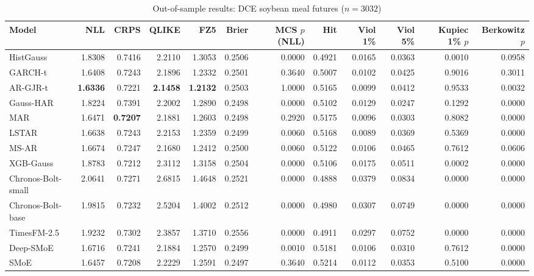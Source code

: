 \begin{table}[!htbp]\centering\scriptsize
\caption{Out-of-sample results: DCE soybean meal futures ($n=3032$)}\label{tab:asset_m_main}
\begin{adjustbox}{max width=\textwidth}
\begin{tabular}{lrrrrrrrrrrr}
\toprule
Model & NLL & CRPS & QLIKE & FZ5 & Brier & MCS $p$ (NLL) & Hit & Viol 1\% & Viol 5\% & Kupiec 1\% $p$ & Berkowitz $p$\\
\midrule
HistGauss & 1.8308 & 0.7416 & 2.2110 & 1.3053 & 0.2506 & 0.0000 & 0.4921 & 0.0165 & 0.0363 & 0.0010 & 0.0958\\
GARCH-t & 1.6408 & 0.7243 & 2.1896 & 1.2332 & 0.2501 & 0.3640 & 0.5007 & 0.0102 & 0.0425 & 0.9016 & 0.3011\\
AR-GJR-t & \textbf{1.6336} & 0.7221 & \textbf{2.1458} & \textbf{1.2132} & 0.2503 & 1.0000 & 0.5165 & 0.0099 & 0.0412 & 0.9533 & 0.0032\\
Gauss-HAR & 1.8224 & 0.7391 & 2.2002 & 1.2890 & 0.2498 & 0.0000 & 0.5102 & 0.0129 & 0.0247 & 0.1292 & 0.0000\\
MAR & 1.6471 & \textbf{0.7207} & 2.1881 & 1.2603 & 0.2498 & 0.2920 & 0.5175 & 0.0096 & 0.0303 & 0.8082 & 0.0000\\
LSTAR & 1.6638 & 0.7243 & 2.2153 & 1.2359 & 0.2499 & 0.0060 & 0.5168 & 0.0089 & 0.0369 & 0.5369 & 0.0000\\
MS-AR & 1.6674 & 0.7247 & 2.1680 & 1.2412 & 0.2500 & 0.0060 & 0.5122 & 0.0106 & 0.0465 & 0.7612 & 0.0606\\
XGB-Gauss & 1.8783 & 0.7212 & 2.3112 & 1.3158 & 0.2504 & 0.0000 & 0.5106 & 0.0175 & 0.0511 & 0.0002 & 0.0000\\
Chronos-Bolt-small & 2.0641 & 0.7271 & 2.6815 & 1.4648 & 0.2521 & 0.0000 & 0.4888 & 0.0379 & 0.0834 & 0.0000 & 0.0000\\
Chronos-Bolt-base & 1.9815 & 0.7232 & 2.5204 & 1.4002 & 0.2512 & 0.0000 & 0.4980 & 0.0307 & 0.0749 & 0.0000 & 0.0000\\
TimesFM-2.5 & 1.9232 & 0.7302 & 2.3857 & 1.3710 & 0.2556 & 0.0000 & 0.4911 & 0.0297 & 0.0752 & 0.0000 & 0.0000\\
Deep-SMoE & 1.6716 & 0.7241 & 2.1884 & 1.2570 & 0.2499 & 0.0010 & 0.5181 & 0.0106 & 0.0310 & 0.7612 & 0.0000\\
SMoE & 1.6457 & 0.7208 & 2.2229 & 1.2591 & 0.2497 & 0.3640 & 0.5214 & 0.0112 & 0.0353 & 0.5100 & 0.0000\\
\bottomrule
\end{tabular}
\end{adjustbox}
\end{table}